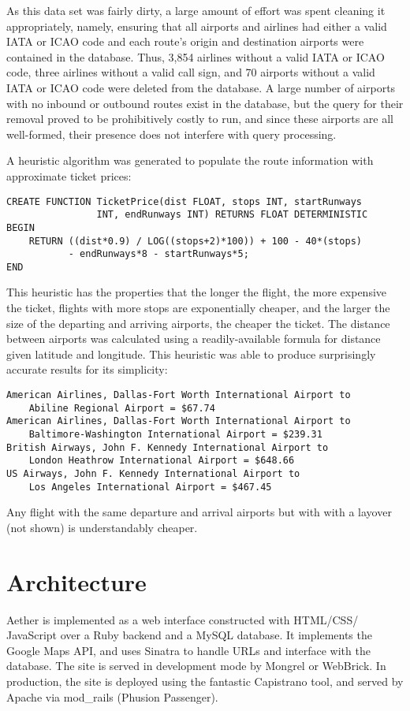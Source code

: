 \documentclass[12pt, letterpaper]{article}
\begin{document}
\indent As this data set was fairly dirty, a large amount of effort was spent cleaning it appropriately, namely, ensuring that all airports and airlines had either a valid IATA or ICAO code and each route's origin and destination airports were contained in the database. Thus, 3,854 airlines without a valid IATA or ICAO code, three airlines without a valid call sign, and 70 airports without a valid IATA or ICAO code were deleted from the database. A large number of airports with no inbound or outbound routes exist in the database, but the query for their removal proved to be prohibitively costly to run, and since these airports are all well-formed, their presence does not interfere with query processing.
	
\indent A heuristic algorithm was generated to populate the route information with approximate ticket prices: 
\begin{verbatim}
CREATE FUNCTION TicketPrice(dist FLOAT, stops INT, startRunways
                INT, endRunways INT) RETURNS FLOAT DETERMINISTIC
BEGIN
    RETURN ((dist*0.9) / LOG((stops+2)*100)) + 100 - 40*(stops)
           - endRunways*8 - startRunways*5;
END
\end{verbatim}
This heuristic has the properties that the longer the flight, the more expensive the ticket, flights with more stops are exponentially cheaper, and the larger the size of the departing and arriving airports, the cheaper the ticket. The distance between airports was calculated using a readily-available formula for distance given latitude and longitude. This heuristic was able to produce surprisingly accurate results for its simplicity:
\begin{verbatim}
American Airlines, Dallas-Fort Worth International Airport to
    Abiline Regional Airport = $67.74 
American Airlines, Dallas-Fort Worth International Airport to
    Baltimore-Washington International Airport = $239.31
British Airways, John F. Kennedy International Airport to
    London Heathrow International Airport = $648.66
US Airways, John F. Kennedy International Airport to 
    Los Angeles International Airport = $467.45
\end{verbatim}
Any flight with the same departure and arrival airports but with with a layover (not shown) is understandably cheaper.

\section{Architecture}
Aether is implemented as a web interface constructed with HTML/CSS/
JavaScript over a Ruby backend and a MySQL database. It implements the Google Maps API, and uses Sinatra to handle URLs and interface with the database. The site is served in development mode by Mongrel or WebBrick. In production, the site is deployed using the fantastic Capistrano tool, and served by Apache via mod\_rails (Phusion Passenger).
\end{document}
